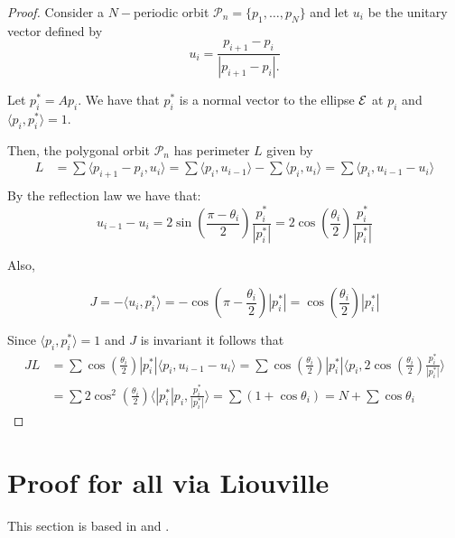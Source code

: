 \begin{proof} Consider a $N-$periodic orbit $\mathcal{P}_n=\{p_1,\ldots, p_N\}$ and let $u_i$ be the unitary vector defined by 
\[u_i=\frac{p_{i+1}-p_i}{|p_{i+1}-p_i|.}\]

Let $p_i^*=Ap_i$. We have that $p_i^*$ is a normal vector to the ellipse $\mathcal{E}$ at $p_i$ and $\langle p_i,p_i^*\rangle=1.$

Then, the polygonal orbit $\mathcal{P}_n$ has perimeter $L$ given by 
\begin{align*}
    L&= \sum \langle p_{i+1}-p_i, u_i\rangle=\sum \langle p_{i} , u_{i-1}\rangle-\sum \langle  p_i, u_i\rangle=\sum \langle p_i, u_{i-1}-u_{i}\rangle\\
\end{align*}
By the reflection law we have that:
\[u_{i-1}-u_i=2\sin\left(\frac{\pi-\theta_i}{2}\right)\frac{p_i^*}{|p_i^*|}=2\cos\left(\frac{\theta_i}{2}\right)\frac{p_i^*}{|p_i^*|}\]

Also,

\[J=-\langle u_i,p_i^* \rangle=-\cos\left(\pi-\frac{\theta_i}{2}\right)|p_i^*|=\cos\left(\frac{\theta_i}{2}\right)|p_i^*|\]

Since $\langle p_i,p_i^*\rangle=1$ and $J$ is invariant it follows that
\begin{align*}
JL&=\sum \cos\left(\frac{\theta_i}{2}\right)|p_i^*|\langle p_i, u_{i-1}-u_{i}\rangle=
\sum \cos\left(\frac{\theta_i}{2}\right)|p_i^*|\langle p_i,2\cos\left(\frac{\theta_i}{2}\right)\frac{p_i^*}{|p_i^*|}\rangle\\
&=\sum 2\cos^2\left( \frac{\theta_i}{2}\right)\langle |p_i^*|p_i, \frac{p_i^*}{|p_i^*|}\rangle=\sum (1+\cos\theta_i)= N+\sum\cos\theta_i
%
\end{align*}
\end{proof}


\section{Proof for all  via Liouville}
 
This section is based in \cite{akopyan2020-invariants} and
\cite{bialy2020-invariants}.

